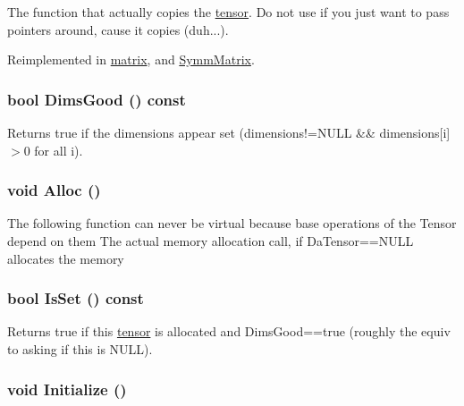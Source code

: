 The function that actually copies the \hyperlink{classJKBuilder_1_1tensor}{tensor}. Do not use if you just want to pass pointers around, cause it copies (duh...). 

Reimplemented in \hyperlink{classJKBuilder_1_1matrix_a75177328107f96ec679d43fce0a9e866}{matrix}, and \hyperlink{classJKBuilder_1_1SymmMatrix_a7be0365900350f51e54969bb1961af8f}{SymmMatrix}.\hypertarget{classJKBuilder_1_1tensor_a6e72344440b411f433eb50171648c2d0}{
\subsubsection[{DimsGood}]{\setlength{\rightskip}{0pt plus 5cm}bool DimsGood () const}}
\label{classJKBuilder_1_1tensor_a6e72344440b411f433eb50171648c2d0}


Returns true if the dimensions appear set (dimensions!=NULL \&\& dimensions\mbox{[}i\mbox{]}$>$0 for all i). \hypertarget{classJKBuilder_1_1tensor_a0ca5cbe96d2a61f06ae4b543ef84f166}{
\subsubsection[{Alloc}]{\setlength{\rightskip}{0pt plus 5cm}void Alloc ()}}
\label{classJKBuilder_1_1tensor_a0ca5cbe96d2a61f06ae4b543ef84f166}
The following function can never be virtual because base operations of the Tensor depend on them The actual memory allocation call, if DaTensor==NULL allocates the memory \hypertarget{classJKBuilder_1_1tensor_a79c9a36acc5dbeab94033ca97971dc09}{
\subsubsection[{IsSet}]{\setlength{\rightskip}{0pt plus 5cm}bool IsSet () const}}
\label{classJKBuilder_1_1tensor_a79c9a36acc5dbeab94033ca97971dc09}


Returns true if this \hyperlink{classJKBuilder_1_1tensor}{tensor} is allocated and DimsGood==true (roughly the equiv to asking if this is NULL). \hypertarget{classJKBuilder_1_1tensor_a98b1050f09da390896f964fb7a892391}{
\subsubsection[{Initialize}]{\setlength{\rightskip}{0pt plus 5cm}void Initialize ()}}
\label{classJKBuilder_1_1tensor_a98b1050f09da390896f964fb7a892391}


